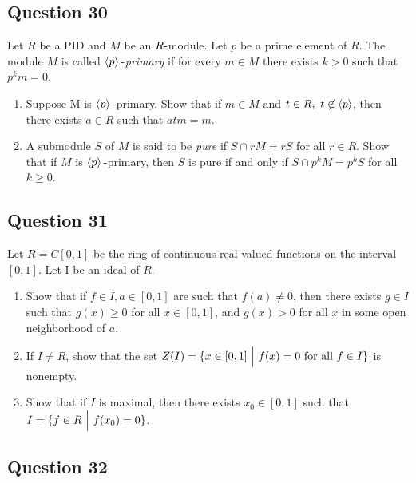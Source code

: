 \documentclass[12pt]{article}
\begin{document}
\hypertarget{question-30}{%
\subsection{Question 30}\label{question-30}}

Let \(R\) be a PID and \(M\) be an \(R{\hbox{-}}\)module. Let \(p\) be a
prime element of \(R\). The module \(M\) is called
\emph{\(\left\langle{p}\right\rangle{\hbox{-}}\)primary} if for every \(m \in M\) there
exists \(k > 0\) such that \(p^k m = 0\).

\begin{enumerate}
\def\labelenumi{(\alph{enumi})}
\item
  Suppose M is \(\left\langle{p}\right\rangle{\hbox{-}}\)primary. Show that if \(m \in M\)
  and \(t \in R, ~t \not\in \left\langle{p}\right\rangle\), then there exists
  \(a \in R\) such that \(atm = m\).
\item
  A submodule \(S\) of \(M\) is said to be \emph{pure} if
  \(S \cap r M = rS\) for all \(r \in R\). Show that if \(M\) is
  \(\left\langle{p}\right\rangle{\hbox{-}}\)primary, then \(S\) is pure if and only if
  \(S \cap p^k M = p^k S\) for all \(k \geq 0\).
\end{enumerate}

\hypertarget{question-31}{%
\subsection{Question 31}\label{question-31}}

Let \(R = C[0, 1]\) be the ring of continuous real-valued functions on
the interval \([0, 1]\). Let I be an ideal of \(R\).

\begin{enumerate}
\def\labelenumi{(\alph{enumi})}
\item
  Show that if \(f \in I, a \in [0, 1]\) are such that \(f (a) \neq 0\),
  then there exists \(g \in I\) such that \(g(x) \geq 0\) for all
  \(x \in [0, 1]\), and \(g(x) > 0\) for all \(x\) in some open
  neighborhood of \(a\).
\item
  If \(I \neq R\), show that the set
  \(Z(I) = \{x \in [0, 1] {~\mathrel{\Big|}~} f(x) = 0 \text{ for all } f \in I\}\)
  is nonempty.
\item
  Show that if \(I\) is maximal, then there exists \(x_0 \in [0, 1]\)
  such that \(I = \{ f \in R {~\mathrel{\Big|}~} f (x_0 ) = 0\}\).
\end{enumerate}

\hypertarget{question-32}{%
\subsection{Question 32}\label{question-32}}
\end{document}

